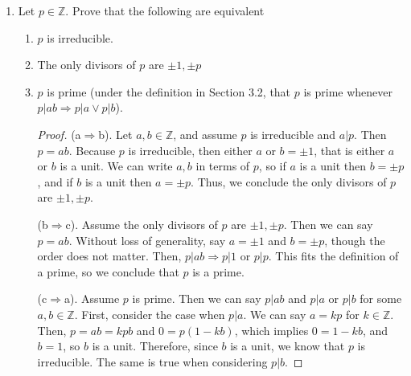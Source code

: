 \documentclass[12pt]{article}
\newcommand{\abs}[1]{\left| #1\right|}
\newcommand{\Z}{\mathbb{Z}}
\begin{document}
\begin{enumerate}
\begin{proof}
 Then $n = qm + r$ so $n - qm = r$ with $0 \leq r < m$. Because $a |m$ and $a |m$ then $a | r$. The same is true for $b$, so $b | r$. Thus, $r = 0$, because if $r > 0$, then $r \in X$, though this is impossible because $ r < m$ and we established that $m$ is the smallest element in the set. Therefore, $r$ must be 0, and we conclude that $n = qm$ or $m|n$ and hence the LCM exists. 

Uniqueness. Assume that $k$ and $\ell$ are both Least Common Multiples of $a$ and $b$. Then, $a|\ell$ and $b|\ell$ and $a|k$ and $b|k$. In addition, we know that $k|\ell$ and $\ell|k$ because both are LCMs. Then, $\abs{k} \leq \abs{\ell}$ and $\abs{\ell} \leq \abs{k}$. Therefore, $\abs{k} = \abs{\ell}$, and it follows that there can only be one unique LCM. 
\end{proof}


\item Let $p\in \Z$. Prove that the following are equivalent
\begin{enumerate}
\item $p$ is irreducible.
\item The only divisors of $p$ are $\pm 1, \pm p$
\item $p$ is prime (under the definition in Section 3.2, that $p$ is prime whenever $p|ab\Rightarrow p|a\vee p|b$).


\begin{proof}
(a$\Rightarrow$b). Let $a,b \in \Z$, and assume $p$ is irreducible and $a | p$. Then $p = ab$. Because $p$ is irreducible, then either $a$ or $b = \pm 1$, that is either $a$ or $b$ is a unit. We can write $a,b$ in terms of $p$, so if $a$ is a unit then $b = \pm p$, and if $b$ is a unit then $a = \pm p$. Thus, we conclude the only divisors of $p$ are $\pm 1, \pm p$.\hfill \break

(b$\Rightarrow$c). Assume the only divisors of $p$ are $\pm 1, \pm p$. Then we can say $p = ab$. Without loss of generality, say $a = \pm 1$ and $b = \pm p$, though the order does not matter. Then, $p | ab \Rightarrow p | 1$ or $p | p$. This fits the definition of a prime, so we conclude that $p$ is a prime. 
\hfill \break

(c$\Rightarrow$a). Assume $p$ is prime. Then we can say $p |ab$ and $p|a$ or $p|b$ for some $a,b \in \Z$. First, consider the case when $p|a$. We can say $a = kp$ for $k \in \Z$. Then, $p = ab = kpb$ and $0 = p(1-kb)$, which implies $0 = 1 - kb$, and $b = 1$, so $b$ is a unit. Therefore, since $b$ is a unit, we know that $p$ is irreducible. The same is true when considering $p|b$. 
\end{proof}
\end{enumerate}


\end{enumerate}
\end{document}
